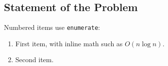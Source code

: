 \subsection{Statement of the Problem}
Numbered items use \texttt{enumerate}:
\begin{enumerate}
    \item First item, with inline math such as $O(n \log n)$.
    \item Second item.
\end{enumerate}